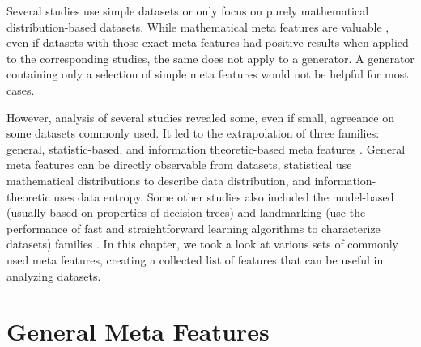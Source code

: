 Several studies use simple datasets or only focus on purely mathematical distribution-based datasets. While mathematical meta features are valuable \citep{KANDA2016393}, even if datasets with those exact meta features had positive results when applied to the corresponding studies, the same does not apply to a generator. A generator containing only a selection of simple meta features would not be helpful for most cases.

However, analysis of several studies revealed some, even if small, agreeance on some datasets commonly used. It led to the extrapolation of three families: general, statistic-based, and information theoretic-based meta features \citep{reif2012dataset, DBLP:journals/corr/WangSSZXZ14}. General meta features can be directly observable from datasets, statistical use mathematical distributions to describe data distribution, and information-theoretic uses data entropy. Some other studies also included the model-based (usually based on properties of decision trees) and landmarking (use the performance of fast and straightforward learning algorithms to characterize datasets) families \citep{rivolli2019characterizing, 7382962}. In this chapter, we took a look at various sets of commonly used meta features, creating a collected list of features that can be useful in analyzing datasets. %

\section{General Meta Features}


